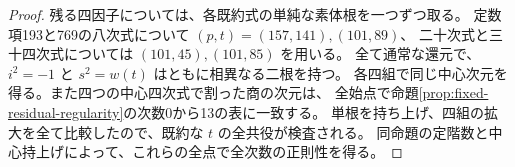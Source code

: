 \begin{proof}
残る四因子については、各既約式の単純な素体根を一つずつ取る。
定数項193と769の八次式について $(p,t)=(157,141),(101,89)$、
二十次式と三十四次式については $(101,45),(101,85)$ を用いる。
全て通常な還元で、$i^2=-1$ と $s^2=w(t)$ はともに相異なる二根を持つ。
各四組で同じ中心次元を得る。また四つの中心四次式で割った商の次元は、
全始点で命題\ref{prop:fixed-residual-regularity}の次数0から13の表に一致する。
単根を持ち上げ、四組の拡大を全て比較したので、既約な $t$ の全共役が検査される。
同命題の定階数と中心持上げによって、これらの全点で全次数の正則性を得る。
\end{proof}
